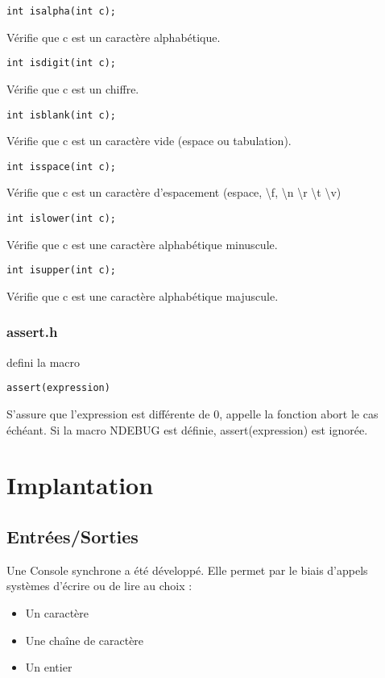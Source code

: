 \documentclass{article}
\begin{document}
\begin{verbatim}
int isalpha(int c);
\end{verbatim}
Vérifie que c est un caractère alphabétique.

\begin{verbatim}
int isdigit(int c);
\end{verbatim}
Vérifie que c est un chiffre.

\begin{verbatim}
int isblank(int c);
\end{verbatim}
Vérifie que c est un caractère vide (espace ou tabulation).

\begin{verbatim}
int isspace(int c);
\end{verbatim}
Vérifie que c est un caractère d'espacement (espace, \textbackslash f,
\textbackslash n \textbackslash r \textbackslash t \textbackslash v)

\begin{verbatim}
int islower(int c);
\end{verbatim}
Vérifie que c est une caractère alphabétique minuscule.

\begin{verbatim}
int isupper(int c);
\end{verbatim}
Vérifie que c est une caractère alphabétique majuscule.

\subsubsection{assert.h}
defini la macro
\begin{verbatim}
assert(expression)
\end{verbatim}

S'assure que l'expression est différente de 0, appelle la fonction abort le cas échéant.
Si la macro NDEBUG est définie, assert(expression) est ignorée.
\section{Implantation}
\subsection{Entrées/Sorties}
Une Console synchrone a été développé. Elle permet par le biais d'appels systèmes d'écrire ou de lire au choix :

\begin{itemize}
\item Un caractère
\item Une chaîne de caractère
\item Un entier
\end{itemize}
\end{document}
